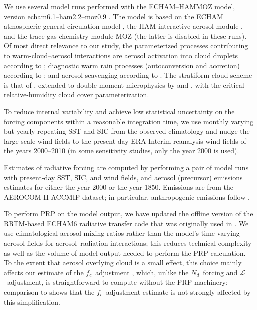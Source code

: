 \documentclass[acp, manuscript]{copernicus}\usepackage[]{graphicx}\usepackage[]{color}
\newcommand\nd{\ensuremath{N_d}}
\newcommand\lwp{\ensuremath{\mathcal L}}
\newcommand\fc{\ensuremath{f_c}}
\newcommand\cf{\fc}
\begin{document}
We use several model runs performed with the ECHAM--HAMMOZ model, version
echam6.1--ham2.2--moz0.9 \citep{Neubauer2014}.  The model is based on the ECHAM
atmospheric general circulation model \citep{Stevens2013}, the HAM interactive
aerosol module \citep{Stier2005,Zhang2012}, and the trace-gas chemistry module
MOZ \citep{Kinnison2007} (the latter is disabled in these runs).  Of most direct
relevance to our study, the parameterized processes contributing to
warm-cloud--aerosol interactions are aerosol activation into cloud droplets
according to \citet{Lin1997}; diagnostic warm rain processes (autoconversion and
accretion) according to \citet{Khairoutdinov2000}; and aerosol scavenging
according to \citet{Croft2009,Croft2010}.  The stratiform cloud scheme is that
of \citet{Lohmann1996}, extended to double-moment microphysics by
\citet{Lohmann2007} and \citet{Lohmann2009}, with the \citet{Sundqvist1989}
critical-relative-humidity cloud cover parameterization.

To reduce internal variability and achieve low statistical uncertainty on the
forcing components within a reasonable integration time, we use monthly
varying but yearly repeating SST and SIC from the observed
climatology and nudge the
large-scale wind fields to the present-day ERA-Interim reanalysis \citep{Dee2011} wind fields
of the years 2000--2010 (in some sensitivity studies, only the year 2000 is
used). 

Estimates of radiative forcing are computed by performing a pair of model runs
with present-day SST, SIC, and wind fields, and aerosol (precursor) emissions
estimates for either the year 2000 or the year 1850.  Emissions are from the
AEROCOM-II ACCMIP dataset; in particular, anthropogenic emissions follow
\citet{Lamarque2010}.  

To perform PRP on the model output, we have updated the offline version of the
RRTM-based ECHAM6 radiative transfer code \citep{Pincus2013} that was originally
used in \citet{Klocke2013}.   We use climatological aerosol mixing ratios 
\citep{Kinne2013} rather than the model's time-varying aerosol fields for aerosol--radiation
interactions; this reduces technical complexity as well as the volume of model
output needed to perform the PRP calculation.  To the extent that aerosol
overlying cloud is a small effect, this choice mainly affects our estimate of
the \cf\ adjustment \citep{Ghan2013,Zelinka2014}, which, unlike the \nd\ forcing
and \lwp\ adjustment, is straightforward to compute without the PRP machinery;
comparison to \citet{Gryspeerdt2019b} shows that the \cf\ adjustment estimate is
not strongly affected by this simplification.
\end{document}
